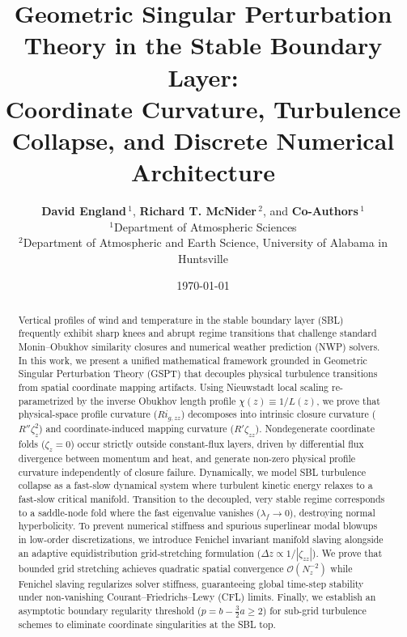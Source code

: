 \documentclass[draft,11pt,twocolumn]{article}
\title{\textbf{Geometric Singular Perturbation Theory in the Stable Boundary Layer:\\ Coordinate Curvature, Turbulence Collapse, and Discrete Numerical Architecture}}
\author{
  \textbf{David England}\,$^1$, \textbf{Richard T. McNider}\,$^2$, and \textbf{Co-Authors}\,$^1$\\[0.8em]
  $^1$Department of Atmospheric Sciences\\
  $^2$Department of Atmospheric and Earth Science, University of Alabama in Huntsville
}
\date{\today}
\theoremstyle{definition}
\theoremstyle{remark}
\begin{document}
\maketitle

\begin{abstract}
Vertical profiles of wind and temperature in the stable boundary layer (SBL) frequently exhibit sharp knees and abrupt regime transitions that challenge standard Monin--Obukhov similarity closures and numerical weather prediction (NWP) solvers. In this work, we present a unified mathematical framework grounded in Geometric Singular Perturbation Theory (GSPT) that decouples physical turbulence transitions from spatial coordinate mapping artifacts. Using Nieuwstadt local scaling re-parametrized by the inverse Obukhov length profile $\chi(z) \equiv 1/L(z)$, we prove that physical-space profile curvature ($Ri_{g,zz}$) decomposes into intrinsic closure curvature ($R''\zeta_z^2$) and coordinate-induced mapping curvature ($R'\zeta_{zz}$). Nondegenerate coordinate folds ($\zeta_z = 0$) occur strictly outside constant-flux layers, driven by differential flux divergence between momentum and heat, and generate non-zero physical profile curvature independently of closure failure. Dynamically, we model SBL turbulence collapse as a fast-slow dynamical system where turbulent kinetic energy relaxes to a fast-slow critical manifold. Transition to the decoupled, very stable regime corresponds to a saddle-node fold where the fast eigenvalue vanishes ($\lambda_f \to 0$), destroying normal hyperbolicity. To prevent numerical stiffness and spurious superlinear modal blowups in low-order discretizations, we introduce Fenichel invariant manifold slaving alongside an adaptive equidistribution grid-stretching formulation ($\Delta z \propto 1/|\zeta_{zz}|$). We prove that bounded grid stretching achieves quadratic spatial convergence $\mathcal{O}(N_z^{-2})$ while Fenichel slaving regularizes solver stiffness, guaranteeing global time-step stability under non-vanishing Courant--Friedrichs--Lewy (CFL) limits. Finally, we establish an asymptotic boundary regularity threshold ($p = b - \frac{3}{2}a \ge 2$) for sub-grid turbulence schemes to eliminate coordinate singularities at the SBL top.
\end{abstract}
\end{document}
